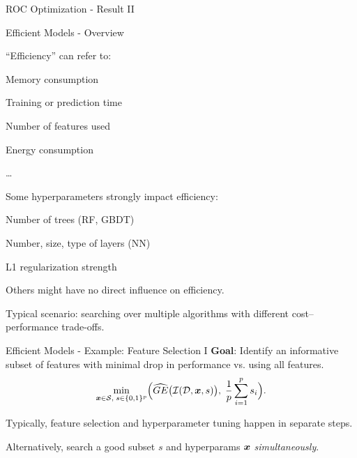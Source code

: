 \documentclass[11pt,compress,t,notes=noshow,xcolor=table]{beamer}
\begin{document}
\begin{framev}{ROC Optimization - Result II}
\end{framev}


\begin{framei}{Efficient Models - Overview}
\item ``Efficiency'' can refer to:
\begin{itemizeM}
\item Memory consumption
\item Training or prediction time
\item Number of features used
\item Energy consumption
\item \ldots
\end{itemizeM}
\item Some hyperparameters strongly impact efficiency:
\begin{itemizeM}
\item Number of trees (RF, GBDT)
\item Number, size, type of layers (NN)
\item L1 regularization strength
\end{itemizeM}
\item Others might have no direct influence on efficiency.
\item Typical scenario: searching over multiple algorithms with different cost--performance trade-offs.
\end{framei}


\begin{framev}{Efficient Models - Example: Feature Selection I}
\textbf{Goal}: Identify an informative subset of features with minimal drop in performance vs. using all features.
$$
\min_{\bm{x}\in \mathcal{S},\; s\in \{0, 1\}^p}
\Bigl(
\widehat{GE}\bigl(\mathcal{I}(\mathcal{D},\bm{x},s)\bigr),\;
\frac{1}{p}\sum_{i=1}^p s_i
\Bigr).
$$
\begin{itemizeM}
\item Typically, feature selection and hyperparameter tuning happen in separate steps.
\item Alternatively, search a good subset $s$ and hyperparams $\bm{x}$ \emph{simultaneously}.
\end{itemizeM}
\end{framev}
\end{document}
